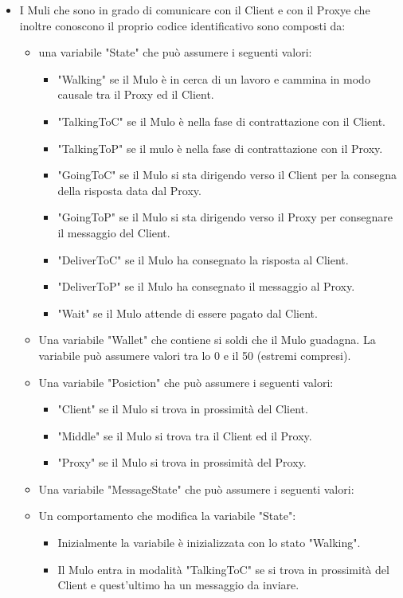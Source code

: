 \documentclass[13pt,a4paper]{article}
\begin{document}
\begin{itemize}
	
	\item I Muli che sono in grado di comunicare con il Client e con il Proxye che inoltre conoscono il proprio codice identificativo sono composti da:
	\begin{itemize}
		\item una variabile "State" che può assumere i seguenti valori:
		\begin{itemize}
			\item "Walking" se il Mulo è in cerca di un lavoro e cammina in modo causale tra il Proxy ed il Client.
			\item "TalkingToC" se il Mulo è nella fase di contrattazione con il Client.
			\item "TalkingToP" se il mulo è nella fase di contrattazione con il Proxy.
			\item "GoingToC" se il Mulo si sta dirigendo verso il Client per la consegna della risposta data dal Proxy.
			\item "GoingToP" se il Mulo si sta dirigendo verso il Proxy per consegnare il messaggio del Client.
			\item "DeliverToC" se il Mulo ha consegnato la risposta al Client.
			\item "DeliverToP" se il Mulo ha consegnato il messaggio al Proxy.
			\item "Wait" se il Mulo attende di essere pagato dal Client.
		\end{itemize}
		\item Una variabile "Wallet" che contiene si soldi che il Mulo guadagna.  La variabile può assumere valori tra lo 0 e il 50 (estremi compresi).
		\item Una variabile "Posiction" che può assumere i seguenti valori:
		\begin{itemize}
			\item "Client" se il Mulo si trova in prossimità del Client.
			\item "Middle" se il Mulo si trova tra il Client ed il Proxy.
			\item "Proxy" se il Mulo si trova in prossimità del Proxy.
		\end{itemize}
	\item Una variabile "MessageState" che può assumere i seguenti valori:
		\item Un comportamento che modifica la variabile "State":
		\begin{itemize}
			\item Inizialmente la variabile è inizializzata con lo stato "Walking".
			\item Il Mulo entra in modalità "TalkingToC" se si trova in prossimità del Client e quest'ultimo ha un messaggio da inviare.

\end{itemize}
\end{itemize}
\end{itemize}
\end{document}
